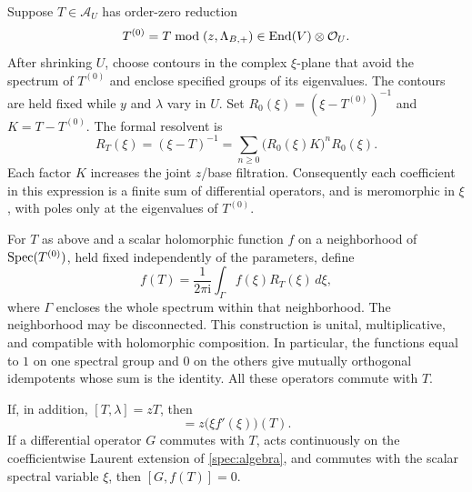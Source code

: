 Suppose $T\in\mathscr A_U$ has order-zero reduction
\[
 T^{(0)}=T\bmod(z,\Lambda_{B,+})\in
                \operatorname{End}(V)\otimes\mathcal O_U.
\]
After shrinking $U$, choose contours in the complex $\xi$-plane that
avoid the spectrum of $T^{(0)}$ and enclose specified groups of its
eigenvalues.  The contours are held fixed while $y$ and $\lambda$ vary
in $U$.  Set $R_0(\xi)=(\xi-T^{(0)})^{-1}$ and
$K=T-T^{(0)}$.  The formal resolvent is
\begin{equation}
 R_T(\xi)=(\xi-T)^{-1}
    =\sum_{n\geq0}\bigl(R_0(\xi)K\bigr)^nR_0(\xi).
 \label{spec:resolvent}
\end{equation}
Each factor $K$ increases the joint $z$/base filtration.  Consequently
each coefficient in this expression is a finite sum of differential
operators, and is meromorphic in $\xi$, with poles only at the
eigenvalues of $T^{(0)}$.

\begin{lemma}
\label{spec:calculus}
For $T$ as above and a scalar holomorphic function $f$ on a neighborhood of
$\operatorname{Spec}(T^{(0)})$, held fixed independently of the parameters, define
\begin{equation}
 f(T)=\frac{1}{2\pi\mathrm i}\int_\Gamma
                  f(\xi)R_T(\xi)\,d\xi,
 \label{spec:functional-calculus}
\end{equation}
where $\Gamma$ encloses the whole spectrum within that neighborhood.
The neighborhood may be disconnected.  This construction is unital,
multiplicative, and compatible with holomorphic composition.  In
particular, the functions equal to $1$ on one spectral group and $0$
on the others give mutually orthogonal idempotents whose sum is the
identity.  All these operators commute with $T$.

If, in addition, $[T,\lambda]=zT$, then
\begin{equation}
 [f(T),\lambda]=z\bigl(\xi f'(\xi)\bigr)(T).
 \label{spec:functional-commutator}
\end{equation}
If a differential operator $G$ commutes with $T$, acts continuously on
the coefficientwise Laurent extension of \eqref{spec:algebra}, and
commutes with the scalar spectral variable $\xi$, then
$[G,f(T)]=0$.
\end{lemma}

